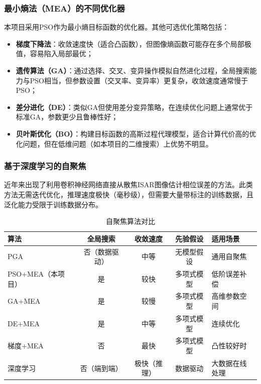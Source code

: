 \documentclass[12pt, a4paper]{article}
\begin{document}
\subsubsection{最小熵法（MEA）的不同优化器}

本项目采用PSO作为最小熵目标函数的优化器。其他可选优化策略包括：

\begin{itemize}
  \item \textbf{梯度下降法}：收敛速度快（适合凸函数），但图像熵函数可能存在多个局部极值，容易陷入局部最优；
  \item \textbf{遗传算法（GA）}\cite{ref_ga}：通过选择、交叉、变异操作模拟自然进化过程，全局搜索能力与PSO相当，但参数设置（交叉率、变异率）更复杂，收敛速度通常慢于PSO；
  \item \textbf{差分进化（DE）}\cite{ref_de}：类似GA但使用差分变异策略，在连续优化问题上通常优于标准GA，参数更少且鲁棒性好；
  \item \textbf{贝叶斯优化（BO）}：构建目标函数的高斯过程代理模型，适合计算代价高的优化问题，但在低维问题（如本项目的二维搜索）上优势不明显。
\end{itemize}

\subsubsection{基于深度学习的自聚焦}

近年来出现了利用卷积神经网络直接从散焦ISAR图像估计相位误差的方法\cite{ref_dl_autofocus}。此类方法无需迭代优化，推理速度极快（毫秒级），但需要大量带标注的训练数据，且泛化能力受限于训练数据分布。

\begin{table}[H]
\centering
\begin{tabularx}{\textwidth}{lCCCL}
\toprule
{}\color{white}\bfseries 算法 &
  \color{white}\bfseries 全局搜索 &
  \color{white}\bfseries 收敛速度 &
  \color{white}\bfseries 先验假设 &
  \color{white}\bfseries 适用场景 \\
\midrule
PGA & 否（数据驱动） & 中等 & 无模型假设 & 通用自聚焦 \\
PSO+MEA（本项目） & 是 & 较快 & 多项式模型 & 低阶误差补偿 \\
GA+MEA & 是 & 较慢 & 多项式模型 & 高维参数空间 \\
DE+MEA & 是 & 中等 & 多项式模型 & 连续优化 \\
梯度+MEA & 否 & 最快 & 多项式模型 & 凸性较好时 \\
深度学习 & 否（端到端） & 极快（推理） & 数据驱动 & 大数据在线处理 \\
\bottomrule
\end{tabularx}
\caption{自聚焦算法对比}
\label{tab:autofocus_comparison}
\end{table}
\end{document}
